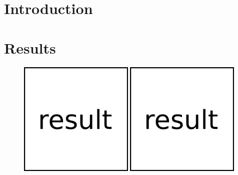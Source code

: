 \documentclass[a1]{sciposter}
\begin{document}
\begin{multicols}{3}


\begin{abstract}
	\lipsum[1]
\end{abstract}


\section{Introduction}
\lipsum[1]

\section{Results}
\begin{figure}
	\includegraphics[width=0.49\textwidth]{fig/result.png}
	\includegraphics[width=0.49\textwidth]{fig/result.png}
\end{figure}
%
\lipsum[1]
%
\begin{figure}

\end{figure}
\end{multicols}
\end{document}
